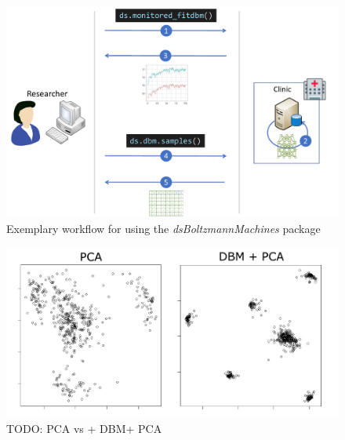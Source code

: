 \documentclass[12pt]{article}
\newcommand{\apkg}[1]{\emph{#1}}
\begin{document}
\begin{figure}[h]
   \centering
   \includegraphics[scale=0.5]{images/dsBoltzmannWorkflow.pdf}
   \caption{Exemplary workflow for using the \apkg{dsBoltzmannMachines} package}
 \end{figure}
 
 
 \begin{figure}[h]
   \centering
   \includegraphics[scale=1]{images/dbmvspca.pdf}
   \caption{TODO: PCA vs + DBM+ PCA}
 \end{figure}
 
\end{document}
